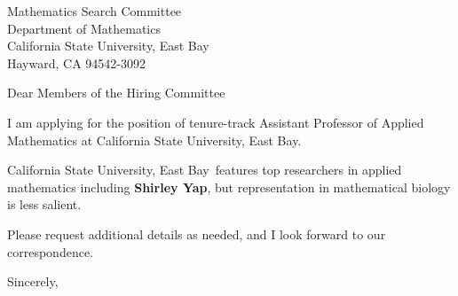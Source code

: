 




	
	
	\def\School{California State University, East Bay}
	
	\begin{letter}
		{Mathematics Search Committee\\
			Department of Mathematics\\
			California State University, East Bay\\
			Hayward, CA 94542-3092
		}
		
		\opening{Dear Members of the Hiring Committee}
		
		
		I am applying for the position of tenure-track Assistant Professor of Applied Mathematics at \School. 
		
		
		
		\School~features top researchers in applied mathematics including \textbf{Shirley  Yap}, but representation in mathematical biology is less salient. 
		
		
		
		
		
		Please request additional details as needed, and I look forward to our correspondence.
		
		\closing{Sincerely,}
	\end{letter}
